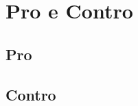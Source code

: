 \chapter{Pro e Contro}\label{cap:procontr}
\section{Pro}\label{sez:pro}
\section{Contro}\label{sez:contro}
